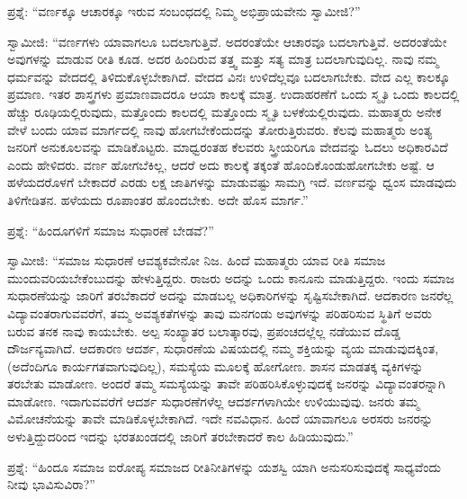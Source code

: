  ಪ್ರಶ್ನೆ: “ವರ್ಣಕ್ಕೂ ಆಚಾರಕ್ಕೂ ಇರುವ ಸಂಬಂಧದಲ್ಲಿ ನಿಮ್ಮ ಅಭಿಪ್ರಾಯವೇನು ಸ್ವಾಮೀಜಿ?” 

 ಸ್ವಾಮೀಜಿ: “ವರ್ಣಗಳು ಯಾವಾಗಲೂ ಬದಲಾಗುತ್ತಿವೆ. ಅದರಂತೆಯೇ ಆಚಾರವೂ ಬದಲಾಗುತ್ತಿವೆ. ಅದರಂತೆಯೇ ಅವುಗಳನ್ನು ಮಾಡುವ ರೀತಿ ಕೂಡ. ಅದರ ಹಿಂದಿರುವ ತತ್ತ್ವ ಮತ್ತು ಸತ್ಯ ಮಾತ್ರ ಬದಲಾಗುವುದಿಲ್ಲ. ನಾವು ನಮ್ಮ ಧರ್ಮವನ್ನು ವೇದದಲ್ಲಿ ತಿಳಿದುಕೊಳ್ಳಬೇಕಾಗಿದೆ. ವೇದದ ವಿನಃ ಉಳಿದೆಲ್ಲವೂ ಬದಲಾಗಬೇಕು. ವೇದ ಎಲ್ಲ ಕಾಲಕ್ಕೂ ಪ್ರಮಾಣ. ಇತರ ಶಾಸ್ತ್ರಗಳು ಪ್ರಮಾಣವಾದರೂ ಆಯಾ ಕಾಲಕ್ಕೆ ಮಾತ್ರ. ಉದಾಹರಣೆಗೆ ಒಂದು ಸ್ಮೃತಿ ಒಂದು ಕಾಲದಲ್ಲಿ ಹೆಚ್ಚು ರೂಢಿಯಲ್ಲಿರುವುದು, ಮತ್ತೊಂದು ಕಾಲದಲ್ಲಿ ಮತ್ತೊಂದು ಸ್ಮೃತಿ ಬಳಕೆಯಲ್ಲಿರುವುದು. ಮಹಾತ್ಮರು ಅನೇಕ ವೇಳೆ ಬಂದು ಯಾವ ಮಾರ್ಗದಲ್ಲಿ ನಾವು ಹೋಗಬೇಕೆಂದುದನ್ನು ತೋರುತ್ತಿರುವರು. ಕೆಲವು ಮಹಾತ್ಮರು ಅಂತ್ಯ ಜನರಿಗೆ ಅನುಕೂಲವನ್ನು ಮಾಡಿಕೊಟ್ಟರು. ಮಾಧ್ವರಂತಹ ಕೆಲವರು ಸ್ತ್ರೀಯರಿಗೂ ವೇದವನ್ನು ಓದಲು ಅಧಿಕಾರವಿದೆ ಎಂದು ಹೇಳಿದರು. ವರ್ಣ ಹೋಗಬೆಕಿಲ್ಲ, ಆದರೆ ಅದು ಕಾಲಕ್ಕೆ ತಕ್ಕಂತೆ ಹೊಂದಿಕೊಂಡುಹೋಗಬೇಕು ಅಷ್ಟೆ. ಆ ಹಳೆಯದರೊಳಗೆ ಬೇಕಾದರೆ ಎರಡು ಲಕ್ಷ ಜಾತಿಗಳನ್ನು ಮಾಡುವಷ್ಟು ಸಾಮಗ್ರಿ ಇದೆ. ವರ್ಣವನ್ನು ಧ್ವಂಸ ಮಾಡವುದು ತಿಳಿಗೇಡಿತನ. ಹಳೆಯದು ರೂಪಾಂತರ ಹೊಂದಬೇಕು. ಅದೇ ಹೊಸ ಮಾರ್ಗ.” 

 ಪ್ರಶ್ನೆ: “ಹಿಂದೂಗಳಿಗೆ ಸಮಾಜ ಸುಧಾರಣೆ ಬೇಡವೆ?” 

 ಸ್ವಾಮೀಜಿ: “ಸಮಾಜ ಸುಧಾರಣೆ ಆವಶ್ಯಕವೇನೋ ನಿಜ. ಹಿಂದೆ ಮಹಾತ್ಮರು ಯಾವ ರೀತಿ ಸಮಾಜ ಮುಂದುವರಿಯಬೇಕೆಂಬುದನ್ನು ಹೇಳುತ್ತಿದ್ದರು. ರಾಜರು ಅದನ್ನು ಒಂದು ಕಾನೂನು ಮಾಡುತ್ತಿದ್ದರು. ಇಂದು ಸಮಾಜ ಸುಧಾರಣೆಯನ್ನು ಜಾರಿಗೆ ತರಬೆಕಾದರೆ ಅದನ್ನು ಮಾಡಬಲ್ಲ ಅಧಿಕಾರಿಗಳನ್ನು ಸೃಷ್ಟಿಸಬೇಕಾಗಿದೆ. ಆದಕಾರಣ ಜನರೆಲ್ಲ ವಿದ್ಯಾವಂತರಾಗುವವರೆಗೆ, ತಮ್ಮ ಅವಶ್ಯಕತೆಗಳನ್ನು ತಾವು ಮನಗಂಡು ಅವುಗಳನ್ನು ಪರಿಹರಿಸುವ ಸ್ಥಿತಿಗೆ ಅವರು ಬರುವ ತನಕ ನಾವು ಕಾಯಬೇಕು. ಅಲ್ಪ ಸಂಖ್ಯಾತರ ಬಲಾತ್ಕಾರವು, ಪ್ರಪಂಚದಲ್ಲೆಲ್ಲ ನಡೆಯುವ ದೊಡ್ಡ ದೌರ್ಜನ್ಯವಾಗಿದೆ. ಆದಕಾರಣ ಆದರ್ಶ, ಸುಧಾರಣೆಯ ವಿಷಯದಲ್ಲಿ ನಮ್ಮ ಶಕ್ತಿಯನ್ನು ವ್ಯಯ ಮಾಡುವುದಕ್ಕಿಂತ, (ಅದೆಂದಿಗೂ ಕಾರ್ಯಗತವಾಗುವುದಿಲ್ಲ), ಸಮಸ್ಯೆಯ ಮೂಲಕ್ಕೆ ಹೋಗೋಣ. ಶಾಸನ ಮಾಡತಕ್ಕ ವ್ಯಕಿಗಳನ್ನು ತರಬೇತು ಮಾಡೋಣ. ಅಂದರೆ ತಮ್ಮ ಸಮಸ್ಯೆಯನ್ನು ತಾವೇ ಪರಿಹರಿಸಿಕೊಳ್ಳುವುದಕ್ಕೆ ಜನರನ್ನು ವಿದ್ಯಾವಂತರನ್ನಾಗಿ ಮಾಡೋಣ. ಇದಾಗುವವರೆಗೆ ಆದರ್ಶ ಸುಧಾರಣೆಗಳೆಲ್ಲ ಆದರ್ಶಗಳಾಗಿಯೇ ಉಳಿಯುವುವು. ಜನರು ತಮ್ಮ ವಿಮೋಚನೆಯನ್ನು ತಾವೇ ಮಾಡಿಕೊಳ್ಳಬೇಕಾಗಿದೆ. ಇದೇ ನವವಿಧಾನ. ಹಿಂದೆ ಯಾವಾಗಲೂ ಅರಸರು ಜನರನ್ನು ಅಳುತ್ತಿದ್ದುದರಿಂದ ಇದನ್ನು ಭರತಖಂಡದಲ್ಲಿ ಜಾರಿಗೆ ತರಬೇಕಾದರೆ ಕಾಲ ಹಿಡಿಯುವುದು.” 

 ಪ್ರಶ್ನೆ: “ಹಿಂದೂ ಸಮಾಜ ಐರೋಪ್ಯ ಸಮಾಜದ ರೀತಿನೀತಿಗಳನ್ನು ಯಶಸ್ವಿ ಯಾಗಿ ಅನುಸರಿಸುವುದಕ್ಕೆ ಸಾಧ್ಯವೆಂದು ನೀವು ಭಾವಿಸುವಿರಾ?” 

